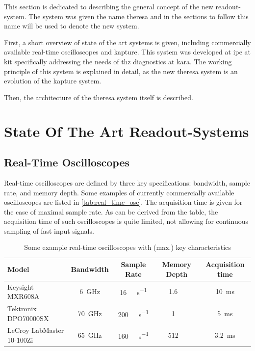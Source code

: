 This section is dedicated to describing the general concept of the new readout-system. 
The system was given the name \gls{theresa} and in the sections to follow  this name will be used to denote the new system.

First, a short overview of state of the art systems is given, including commercially available real-time oscilloscopes and \gls{kapture}.
This system was developed at \gls{ipe} at \gls{kit} specifically addressing the needs of \gls{thz} diagnostics at \gls{kara}.
The working principle of this system is explained in detail, as the new \gls{theresa} system is an evolution of the \gls{kapture} system. 

Then, the architecture of the \gls{theresa} system itself is described.

\section{State Of The Art Readout-Systems}
\subsection*{Real-Time Oscilloscopes}
Real-time oscilloscopes are defined by three key specifications: bandwidth, sample rate, and memory depth.
Some examples of currently commercially available oscilloscopes are listed in \autoref{tab:real_time_osc}.
The acquisition time is given for the case of maximal sample rate.
As can be derived from the table, the acquisition time of such oscilloscopes is quite limited, not allowing for continuous sampling of fast input signals. %
\begin{table}[tbh]
	\caption[Real Time Oscilloscopes Examples]{Some example real-time oscilloscopes with (max.) key characteristics}
	\label{tab:real_time_osc}
	\centering
	\begin{tabularx}{\textwidth}{Xcccc}
		\toprule
		\textbf{Model}            & \textbf{Bandwidth} &         \textbf{Sample Rate}         &  \textbf{Memory Depth}  & \textbf{Acquisition time} \\ \midrule
		Keysight MXR608A          &    \SI{6}{\GHz}    & \SI{16}{\giga \sample \per \second}  & \SI{1.6}{\giga \sample} &  \SI{10}{\milli \second}  \\
		Tektronix DPO70000SX      &   \SI{70}{\GHz}    & \SI{200}{\giga \sample \per \second} &  \SI{1}{\giga \sample}  &  \SI{5}{\milli \second}   \\
		LeCroy LabMaster 10-100Zi &   \SI{65}{\GHz}    & \SI{160}{\giga \sample \per \second} & \SI{512}{\mega \sample} & \SI{3.2}{\milli \second}  \\ \bottomrule
	\end{tabularx}
\end{table}


